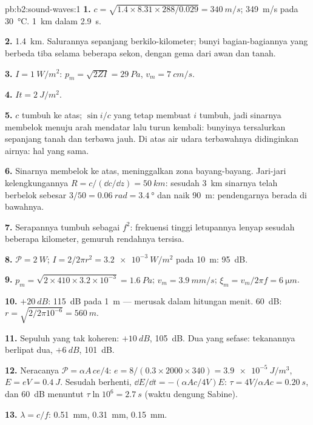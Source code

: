 \begin{solution}{pb:b2:sound-waves:1}
\textbf{1.} $c = \sqrt{1.4 \times 8.31 \times 288/0.029} = \qty{340}{m/s}$; \qty{349}{m/s}
pada \qty{30}{\degreeCelsius}. \qty{1}{km} dalam \qty{2.9}{s}.

\textbf{2.} \qty{1.4}{km}. Salurannya sepanjang berkilo-kilometer; bunyi
bagian-bagiannya yang berbeda tiba selama beberapa sekon, dengan gema dari awan dan
tanah.

\textbf{3.} $I = \qty{1}{W/m^2}$: $p_m = \sqrt{2ZI} = \qty{29}{Pa}$, $v_m = \qty{7}{cm/s}$.

\textbf{4.} $It = \qty{2}{J/m^2}$.

\textbf{5.} $c$ tumbuh ke atas; $\sin i/c$ yang tetap membuat $i$ tumbuh, jadi
sinarnya membelok menuju arah mendatar lalu turun kembali: bunyinya tersalurkan
sepanjang tanah dan terbawa jauh. Di atas air udara terbawahnya didinginkan
airnya: hal yang sama.

\textbf{6.} Sinarnya membelok ke atas, meninggalkan zona bayang-bayang. Jari-jari
kelengkungannya $R = c/(\dd c/\dd z) = \qty{50}{km}$: sesudah \qty{3}{km} sinarnya telah
berbelok sebesar $3/50 = \qty{0.06}{rad} = \qty{3.4}{\degree}$ dan naik \qty{90}{m}:
pendengarnya berada di bawahnya.

\textbf{7.} Serapannya tumbuh sebagai $f^2$: frekuensi tinggi letupannya
lenyap sesudah beberapa kilometer, gemuruh rendahnya tersisa.

\textbf{8.} $\mathcal P = \qty{2}{W}$; $I = 2/2\pi r^2 = \qty{3.2e-3}{W/m^2}$ pada \qty{10}{m}:
\qty{95}{dB}.

\textbf{9.} $p_m = \sqrt{2 \times 410 \times 3.2 \times 10^{-3}} = \qty{1.6}{Pa}$; $v_m = \qty{3.9}{mm/s}$;
$\xi_m = v_m/2\pi f = \qty{6}{\micro m}$.

\textbf{10.} $+\qty{20}{dB}$: \qty{115}{dB} pada \qty{1}{m} --- merusak dalam
hitungan menit. \qty{60}{dB}: $r = \sqrt{2/2\pi10^{-6}} = \qty{560}{m}$.

\textbf{11.} Sepuluh yang tak koheren: $+\qty{10}{dB}$, \qty{105}{dB}. Dua yang sefase:
tekanannya berlipat dua, $+\qty{6}{dB}$, \qty{101}{dB}.

\textbf{12.} Neracanya $\mathcal P = \alpha A\,ce/4$: $e = 8/(0.3 \times 2000 \times 340) =
\qty{3.9e-5}{J/m^3}$, $E = eV = \qty{0.4}{J}$. Sesudah berhenti, $\dd E/\dd t = -(\alpha Ac
/4V)E$: $\tau = 4V/\alpha Ac = \qty{0.20}{s}$, dan \qty{60}{dB} menuntut $\tau\ln10^6 =
\qty{2.7}{s}$ (waktu dengung Sabine).

\textbf{13.} $\lambda = c/f$: \qty{0.51}{mm}, \qty{0.31}{mm}, \qty{0.15}{mm}.


\end{solution}

